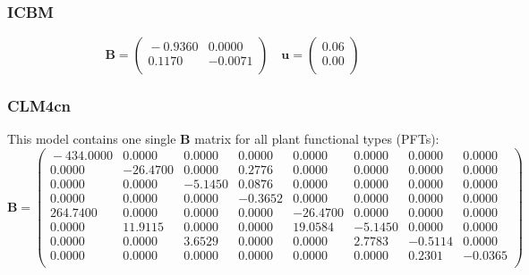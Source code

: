 \documentclass[draft,linenumbers]{agujournal}
\begin{document}
\subsubsection*{ICBM}
\begin{equation}
\mathbf{B} =
\begin{pmatrix}{}
  -0.9360 & 0.0000 \\ 
  0.1170 & -0.0071 \\ 
  \end{pmatrix}
\quad {\bm u} =
\begin{pmatrix}{}
  0.06 \\ 
  0.00 \\ 
  \end{pmatrix}
\end{equation}

\subsubsection*{CLM4cn}
This model contains one single $\mathbf{B}$ matrix for all plant functional types (PFTs):
\begin{equation}
\mathbf{B} =
\begin{pmatrix}{}
  -434.0000 & 0.0000 & 0.0000 & 0.0000 & 0.0000 & 0.0000 & 0.0000 & 0.0000 \\ 
  0.0000 & -26.4700 & 0.0000 & 0.2776 & 0.0000 & 0.0000 & 0.0000 & 0.0000 \\ 
  0.0000 & 0.0000 & -5.1450 & 0.0876 & 0.0000 & 0.0000 & 0.0000 & 0.0000 \\ 
  0.0000 & 0.0000 & 0.0000 & -0.3652 & 0.0000 & 0.0000 & 0.0000 & 0.0000 \\ 
  264.7400 & 0.0000 & 0.0000 & 0.0000 & -26.4700 & 0.0000 & 0.0000 & 0.0000 \\ 
  0.0000 & 11.9115 & 0.0000 & 0.0000 & 19.0584 & -5.1450 & 0.0000 & 0.0000 \\ 
  0.0000 & 0.0000 & 3.6529 & 0.0000 & 0.0000 & 2.7783 & -0.5114 & 0.0000 \\ 
  0.0000 & 0.0000 & 0.0000 & 0.0000 & 0.0000 & 0.0000 & 0.2301 & -0.0365 \\ 
  \end{pmatrix}
\end{equation}
\end{document}
